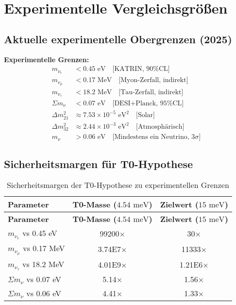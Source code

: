 \documentclass[12pt,a4paper]{article}
\begin{document}
	\section{Experimentelle Vergleichsgrößen}
	
	\subsection{Aktuelle experimentelle Obergrenzen (2025)}
	
	\begin{experimental}
		\textbf{Experimentelle Grenzen:}
		\begin{align}
			m_{\nu_e} &< 0.45 \text{ eV} \quad \text{[KATRIN, 90\% CL]} \\
			m_{\nu_\mu} &< 0.17 \text{ MeV} \quad \text{[Myon-Zerfall, indirekt]} \\
			m_{\nu_\tau} &< 18.2 \text{ MeV} \quad \text{[Tau-Zerfall, indirekt]} \\
			\Sigma m_\nu &< 0.07 \text{ eV} \quad \text{[DESI+Planck, 95\% CL]} \\
			\Delta m^2_{21} &\approx 7.53 \times 10^{-5} \text{ eV}^2 \quad \text{[Solar]} \\
			\Delta m^2_{32} &\approx 2.44 \times 10^{-3} \text{ eV}^2 \quad \text{[Atmosphärisch]} \\
			m_\nu &> 0.06 \text{ eV} \quad \text{[Mindestens ein Neutrino, 3}\sigma\text{]}
		\end{align}
	\end{experimental}
	
	\subsection{Sicherheitsmargen für T0-Hypothese}
	
	\begin{longtable}[c]{@{}lcc@{}}
		\caption{Sicherheitsmargen der T0-Hypothese zu experimentellen Grenzen} \\
		\toprule
		\textbf{Parameter} & \textbf{T0-Masse (\(4.54 \text{ meV}\))} & \textbf{Zielwert (\(15 \text{ meV}\))} \\
		\midrule
		\endfirsthead
		\toprule
		\textbf{Parameter} & \textbf{T0-Masse (\(4.54 \text{ meV}\))} & \textbf{Zielwert (\(15 \text{ meV}\))} \\
		\midrule
		\endhead
		$m_{\nu_e}$ vs 0.45 eV & 99200× & 30× \\
		$m_{\nu_\mu}$ vs 0.17 MeV & 3.74E7× & 11333× \\
		$m_{\nu_\tau}$ vs 18.2 MeV & 4.01E9× & 1.21E6× \\
		\midrule
		$\Sigma m_\nu$ vs 0.07 eV & 5.14× & 1.56× \\
		$\Sigma m_\nu$ vs 0.06 eV & 4.41× & 1.33× \\
		\bottomrule
	\end{longtable}
	
\end{document}
